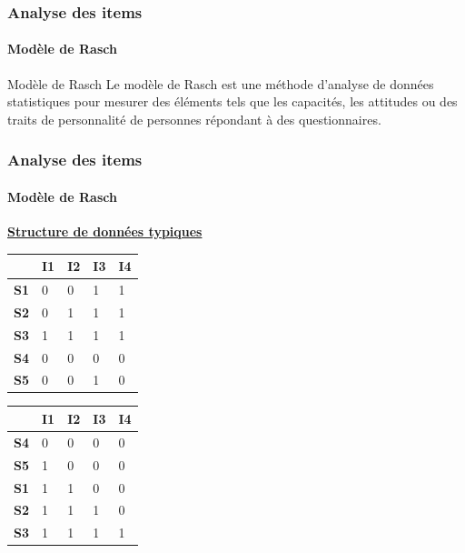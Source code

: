 \documentclass[aspectratio=169,professionalfonts, 12pt]{beamer}
\begin{document}
\begin{frame}
  \frametitle{Analyse des items}
  \framesubtitle{Modèle de Rasch}
  \justifying 
  \begin{minipage}{\textwidth}
  \begin{block}{Modèle de Rasch}
    Le modèle de Rasch est une méthode d'analyse de données statistiques pour mesurer des éléments tels que les capacités, les attitudes ou des traits de personnalité de personnes répondant à des questionnaires. 
  \end{block}  
  \end{minipage} 
\end{frame}


\begin{frame}
  \frametitle{Analyse des items}
  \framesubtitle{Modèle de Rasch}
  \justifying 
  \begin{minipage}{\textwidth}
    \centering \textbf{\underline{Structure de données typiques}}
    \begin{table}[H]
      \centering
      \begin{tabular}{|m{0.5cm}|m{0.5cm}|m{0.5cm}|m{0.5cm}|m{0.5cm}|} \hline
       & \textbf{I1} & \textbf{I2} & \textbf{I3} & \textbf{I4} \\ \hline
       \textbf{S1} & 0 & 0 & 1 & 1 \\ \hline
       \textbf{S2} & 0 & 1 & 1 & 1 \\ \hline
       \textbf{S3} & 1 & 1 & 1 & 1 \\ \hline
       \textbf{S4} & 0 & 0 & 0 & 0 \\ \hline
       \textbf{S5} & 0 & 0 & 1 & 0 \\ \hline
      \end{tabular}
      \hfill
      \begin{tabular}{|m{0.5cm}|m{0.5cm}|m{0.5cm}|m{0.5cm}|m{0.5cm}|} \hline
        & \textbf{I1} & \textbf{I2} & \textbf{I3} & \textbf{I4} \\ \hline
        \textbf{S4} & 0 & 0 & 0 & 0 \\ \hline
        \textbf{S5} & 1 & 0 & 0 & 0 \\ \hline
        \textbf{S1} & 1 & 1 & 0 & 0 \\ \hline
        \textbf{S2} & 1 & 1 & 1 & 0 \\ \hline
        \textbf{S3} & 1 & 1 & 1 & 1 \\ \hline
       \end{tabular}
    \end{table}
  \end{minipage} 
\end{frame}
\end{document}
